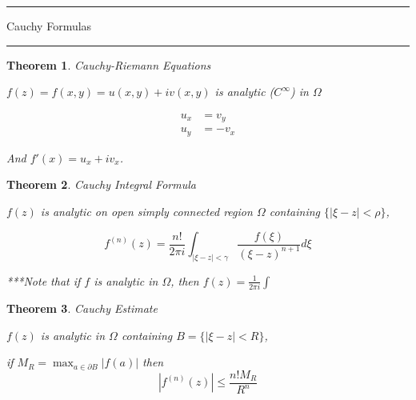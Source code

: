 \documentclass[12pt]{Qual}
\newtheorem{theorem}{Theorem}
\begin{document}
\begin{center}
\noindent\textcolor{blue!60!black}{\rule{15cm}{1mm}}
\Huge \faBug\faPuzzlePiece\faCoffee Cauchy Formulas \faCoffee\faPuzzlePiece\faBug
\vspace{-0.5cm}
\noindent\textcolor{blue!60!black}{\rule{15cm}{1mm}}
\end{center}
\vspace{0.5cm}
\begin{theorem}{\Large\textit{Cauchy-Riemann Equations}}

\begin{minipage}{0.4\textwidth}
$f(z)=f(x,y)=u(x,y)+iv(x,y)$ is analytic ($C^\infty$) in $\Omega$
\end{minipage}\hspace{1.5cm}\boxed{\iff}\hspace{-1cm}\begin{minipage}{0.4\textwidth}
\hspace{-3.5cm}\vspace{-1cm}
\begin{align*}
    u_x&=v_y\\
    u_y&=-v_x
\end{align*}
\end{minipage}

And $f'(x)=u_x+iv_x$.
\end{theorem}
\vspace{0.5cm}
\begin{theorem}{\Large\textit{Cauchy Integral Formula}}

 $f(z)$ is analytic on open simply connected region $\Omega$ containing $\{|\xi-z|<\rho\}$,

 $$f^{(n)}(z)=\frac{n!}{2\pi i}\int_{|\xi-z|<\gamma}\frac{f(\xi)}{(\xi-z)^{n+1}}d\xi$$

\begin{mybox}
***Note that if $f$ is analytic in $\Omega$, then $\displaystyle f(z)=\frac{1}{2\pi i}\int$
\end{mybox}
\end{theorem}
\vspace{0.5cm}
\begin{theorem}{\Large\textit{Cauchy Estimate}}

 $f(z)$ is analytic in $\Omega$ containing $B=\{|\xi-z|<R\}$,

 if $\displaystyle M_R=\max_{a\in\partial B}|f(a)|$ then $$|f^{(n)}(z)|\le\frac{n!M_R}{R^n}$$

\end{theorem}
\newpage
\end{document}
